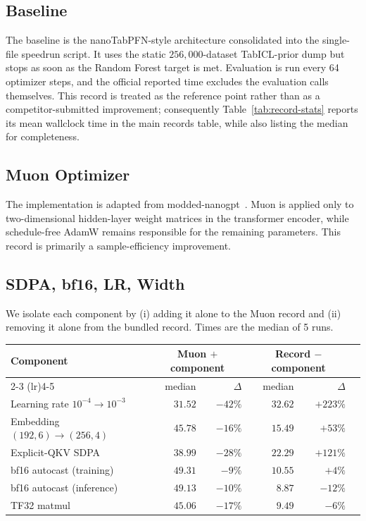 \documentclass{article}
\theoremstyle{plain}
\theoremstyle{definition}
\theoremstyle{remark}
\begin{document}
\subsection{Baseline}
\label{app:records-baseline}
The baseline is the nanoTabPFN-style architecture consolidated into the single-file speedrun script.
It uses the static $256{,}000$-dataset TabICL-prior dump but stops as soon as the Random Forest target is met.
Evaluation is run every 64 optimizer steps, and the official reported time excludes the evaluation calls themselves.
This record is treated as the reference point rather than as a competitor-submitted improvement; consequently Table~\ref{tab:record-stats} reports its mean wallclock time in the main records table, while also listing the median for completeness.

\subsection{Muon Optimizer}
\label{app:records-muon}
The implementation is adapted from modded-nanogpt~\citep{moddednanogpt}.
Muon is applied only to two-dimensional hidden-layer weight matrices in the transformer encoder, while schedule-free AdamW remains responsible for the remaining parameters.
This record is primarily a sample-efficiency improvement.

\subsection{SDPA, bf16, LR, Width}
\label{app:records-carter}
We isolate each component by (i) adding it alone to the Muon record and (ii) removing it alone from the bundled record. Times are the median of 5 runs.

\begin{center}
\small
\begin{tabular}{@{}lrrrrr@{}}
  \toprule
  Component & \multicolumn{2}{c}{Muon $+$ component} & \multicolumn{2}{c}{Record $-$ component} \\
  \cmidrule(lr){2-3} \cmidrule(lr){4-5}
       & median & $\Delta$ & median & $\Delta$ \\
  \midrule
  Learning rate $10^{-4}\to 10^{-3}$ & $31.52$ & $-42\%$ & $32.62$ & $+223\%$ \\
  Embedding $(192,6)\to(256,4)$       & $45.78$ & $-16\%$ & $15.49$ & $+53\%$  \\
  Explicit-QKV SDPA                   & $38.99$ & $-28\%$ & $22.29$ & $+121\%$ \\
  bf16 autocast (training)            & $49.31$ & $-9\%$  & $10.55$ & $+4\%$   \\
  bf16 autocast (inference)           & $49.13$ & $-10\%$ & $\phantom{0}8.87$ & $-12\%$  \\
  TF32 matmul                         & $45.06$ & $-17\%$ & $\phantom{0}9.49$ & $-6\%$   \\
  \bottomrule
\end{tabular}
\end{center}
\end{document}

